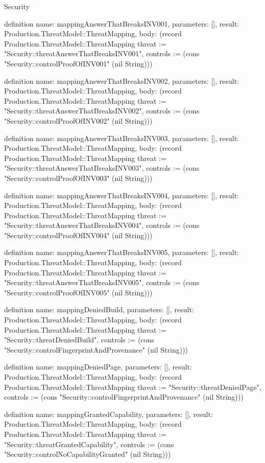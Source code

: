 \begin{lexlean}{Security}
\begin{semanticmodule}
definition{
  name: mappingAnswerThatBreaksINV001,
  parameters: [],
  result: Production.ThreatModel::ThreatMapping,
  body: (record Production.ThreatModel::ThreatMapping {threat := "Security::threatAnswerThatBreaksINV001", controls := (cons "Security::controlProofOfINV001" (nil String))})
}

definition{
  name: mappingAnswerThatBreaksINV002,
  parameters: [],
  result: Production.ThreatModel::ThreatMapping,
  body: (record Production.ThreatModel::ThreatMapping {threat := "Security::threatAnswerThatBreaksINV002", controls := (cons "Security::controlProofOfINV002" (nil String))})
}

definition{
  name: mappingAnswerThatBreaksINV003,
  parameters: [],
  result: Production.ThreatModel::ThreatMapping,
  body: (record Production.ThreatModel::ThreatMapping {threat := "Security::threatAnswerThatBreaksINV003", controls := (cons "Security::controlProofOfINV003" (nil String))})
}

definition{
  name: mappingAnswerThatBreaksINV004,
  parameters: [],
  result: Production.ThreatModel::ThreatMapping,
  body: (record Production.ThreatModel::ThreatMapping {threat := "Security::threatAnswerThatBreaksINV004", controls := (cons "Security::controlProofOfINV004" (nil String))})
}

definition{
  name: mappingAnswerThatBreaksINV005,
  parameters: [],
  result: Production.ThreatModel::ThreatMapping,
  body: (record Production.ThreatModel::ThreatMapping {threat := "Security::threatAnswerThatBreaksINV005", controls := (cons "Security::controlProofOfINV005" (nil String))})
}

definition{
  name: mappingDeniedBuild,
  parameters: [],
  result: Production.ThreatModel::ThreatMapping,
  body: (record Production.ThreatModel::ThreatMapping {threat := "Security::threatDeniedBuild", controls := (cons "Security::controlFingerprintAndProvenance" (nil String))})
}

definition{
  name: mappingDeniedPage,
  parameters: [],
  result: Production.ThreatModel::ThreatMapping,
  body: (record Production.ThreatModel::ThreatMapping {threat := "Security::threatDeniedPage", controls := (cons "Security::controlFingerprintAndProvenance" (nil String))})
}

definition{
  name: mappingGrantedCapability,
  parameters: [],
  result: Production.ThreatModel::ThreatMapping,
  body: (record Production.ThreatModel::ThreatMapping {threat := "Security::threatGrantedCapability", controls := (cons "Security::controlNoCapabilityGranted" (nil String))})
}


\end{semanticmodule}
\end{lexlean}
